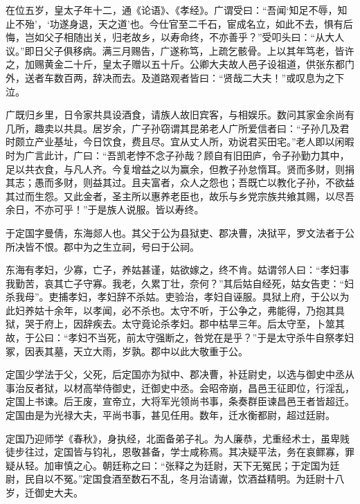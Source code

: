 \documentclass[12pt,UTF8]{ctexbook}
\begin{document}
在位五岁，皇太子年十二，通《论语》、《孝经》。广谓受曰：“吾闻‘知足不辱，知止不殆’，‘功遂身退，天之道’也。今仕官至二千石，宦成名立，如此不去，惧有后悔，岂如父子相随出关，归老故乡，以寿命终，不亦善乎？”受叩头曰：“从大人议。”即日父子俱移病。满三月赐告，广遂称笃，上疏乞骸骨。上以其年笃老，皆许之，加赐黄金二十斤，皇太子赠以五十斤。公卿大夫故人邑子设祖道，供张东都门外，送者车数百两，辞决而去。及道路观者皆曰：“贤哉二大夫！”或叹息为之下泣。



广既归乡里，日令家共具设酒食，请族人故旧宾客，与相娱乐。数问其家金余尚有几所，趣卖以共具。居岁余，广子孙窃谓其昆弟老人广所爱信者曰：“子孙几及君时颇立产业基址，今日饮食，费且尽。宜从丈人所，劝说君买田宅。”老人即以闲暇时为广言此计，广曰：“吾凯老悖不念子孙哉？顾自有旧田庐，令子孙勤力其中，足以共衣食，与凡人齐。今复增益之以为赢余，但教子孙怠惰耳。贤而多财，则捐其志；愚而多财，则益其过。且夫富者，众人之怨也；吾既亡以教化子孙，不欲益其过而生怨。又此金者，圣主所以惠养老臣也，故乐与乡党宗族共飨其赐，以尽吾余日，不亦可乎！”于是族人说服。皆以寿终。



于定国字曼倩，东海郯人也。其父于公为县狱吏、郡决曹，决狱平，罗文法者于公所决皆不恨。郡中为之生立祠，号曰于公祠。



东海有孝妇，少寡，亡子，养姑甚谨，姑欲嫁之，终不肯。姑谓邻人曰：“孝妇事我勤苦，哀其亡子守寡。我老，久累丁壮，奈何？”其后姑自经死，姑女告吏：“妇杀我母”。吏捕孝妇，孝妇辞不杀姑。吏验治，孝妇自诬服。具狱上府，于公以为此妇养姑十余年，以孝闻，必不杀也。太守不听，于公争之，弗能得，乃抱其具狱，哭于府上，因辞疾去。太守竟论杀孝妇。郡中枯旱三年。后太守至，卜筮其故，于公曰：“孝妇不当死，前太守强断之，咎党在是乎？”于是太守杀牛自祭孝妇冢，因表其墓，天立大雨，岁孰。郡中以此大敬重于公。



定国少学法于父，父死，后定国亦为狱中、郡决曹，补廷尉史，以选与御史中丞从事治反者狱，以材高举侍御史，迁御史中丞。会昭帝崩，昌邑王征即位，行淫乱，定国上书谏。后王废，宣帝立，大将军光领尚书事，条奏群臣谏昌邑王者皆超迁。定国由是为光禄大夫，平尚书事，甚见任用。数年，迁水衡都尉，超过廷尉。



定国乃迎师学《春秋》，身执经，北面备弟子礼。为人廉恭，尤重经术士，虽卑贱徒步往过，定国皆与钧礼，恩敬甚备，学士咸称焉。其决疑平法，务在哀鳏寡，罪疑从轻。加审慎之心。朝廷称之曰：“张释之为廷尉，天下无冤民；于定国为廷尉，民自以不冤。”定国食酒至数石不乱，冬月治请谳，饮酒益精明。为廷尉十八岁，迁御史大夫。
\end{document}
